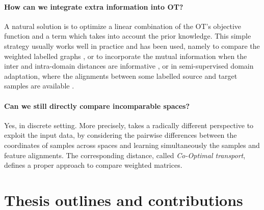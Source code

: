 \paragraph{How can we integrate extra information into OT?} A natural solution is to optimize
a linear combination of the OT's objective function and a term which takes into account the
prior knowledge. This simple strategy usually works well in practice and has been used, namely to
compare the weighted labelled graphs \citep{Vayer19b}, or to incorporate the mutual information
when the inter and intra-domain distances are informative \citep{Chuang23},
or in semi-supervised domain adaptation, where the alignments between some labelled source
and target samples are available \citep{Gu22}.


\paragraph{Can we still \textbf{directly} compare \textbf{incomparable spaces}?} Yes,
in discrete setting. More precisely, \citet{Redko20} takes a radically different perspective
to exploit the input data, by considering the pairwise differences between the coordinates
of samples across spaces and learning simultaneously the samples and feature alignments.
The corresponding distance, called \textit{Co-Optimal transport}, defines a proper approach
to compare weighted matrices.

\section{Thesis outlines and contributions}

